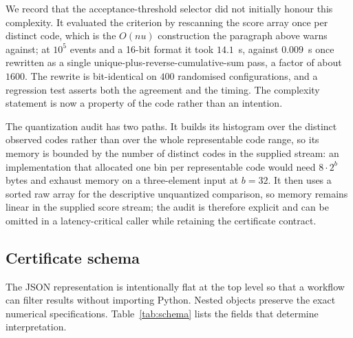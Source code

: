 \documentclass[preprint,12pt]{elsarticle}
\begin{document}
We record that the acceptance-threshold selector did not initially honour this
complexity.  It evaluated the criterion by rescanning the score array once per
distinct code, which is the $O(nu)$ construction the paragraph above warns
against; at $10^5$ events and a 16-bit format it took $14.1$~s, against
$0.009$~s once rewritten as a single unique-plus-reverse-cumulative-sum pass,
a factor of about $1600$.  The rewrite is bit-identical on $400$ randomised
configurations, and a regression test asserts both the agreement and the
timing.  The complexity statement is now a property of the code rather than an
intention.

The quantization audit has two paths.  It builds its histogram over the distinct
observed codes rather than over the whole representable code range, so its
memory is bounded by the number of distinct codes in the supplied stream: an
implementation that allocated one bin per representable code would need $8\cdot
2^{b}$ bytes and exhaust memory on a three-element input at $b=32$.  It then uses
a sorted raw array for the descriptive unquantized comparison, so memory remains
linear in the supplied score stream; the audit is therefore explicit and can be
omitted in a latency-critical
caller while retaining the certificate contract.

\subsection{Certificate schema}

The JSON representation is intentionally flat at the top level so that a
workflow can filter results without importing Python.  Nested objects preserve
the exact numerical specifications.  Table~\ref{tab:schema} lists the fields
that determine interpretation.
\end{document}
